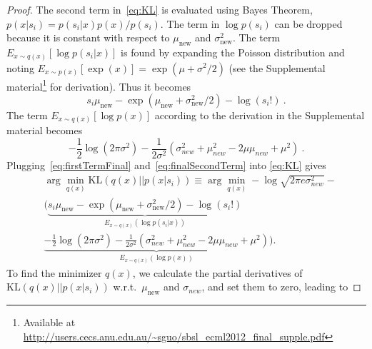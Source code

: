 \documentclass[runningheads,a4paper]{llncs}
\begin{document}
\begin{proof}
The second term in~\eqref{eq:KL} is evaluated using
Bayes Theorem,
$p(x|s_i)=p(s_i|x)p(x)/p(s_i)$.
The term in $\log p(s_i)$ can be dropped because it is constant
with respect to $\mu_{\text{new}}$ and $\sigma_{\text{new}}^2$.
The term $E_{x\sim q(x)} [\log p(s_i|x)]$ is found by expanding the
Poisson distribution and noting $E_{x\sim p(x)}[\exp(x)] = \exp(\mu+\sigma^2/2)$ (see the Supplemental material\footnote{Available at \url{http://users.cecs.anu.edu.au/~sguo/sbsl_ecml2012_final_supple.pdf}} for derivation).
Thus it becomes
{\small
\begin{equation}\label{eq:firstTermFinal}
  s_i \mu_{\text{new}} - \exp(\mu_{\text{new}} + \sigma_{\text{new}}^2/2) - \log(s_i!)~.
\end{equation}}
\noindent
The term $E_{x\sim q(x)}[\log p(x)]$
according to the derivation in the Supplemental material
becomes
{\small
\begin{equation}\label{eq:finalSecondTerm}
     -\frac{1}{2}\log(2\pi\sigma^2) -
         \frac{1}{2\sigma^2}\left(\sigma_{new}^2 + \mu_{new}^2-2\mu\mu_{new} + \mu^2 \right)~.
\end{equation}}
Plugging~\eqref{eq:firstTermFinal} and~\eqref{eq:finalSecondTerm} into
\eqref{eq:KL} gives
{\small
\begin{align*}
    &\arg\min_{q(x)}\text{KL}\left(q(x)|| p(x|s_i)\right) \equiv \arg\min_{q(x)}-\log\sqrt{2\pi e \sigma_{new}^2} - \nonumber \\
    &\bigg( \underbrace{s_i \mu_{\text{new}} - \exp(\mu_{\text{new}} + \sigma_{\text{new}}^2/2) - \log(s_i!)}_{E_{x\sim q(x)} (\log p(s_i|x))} \nonumber \\ 
    & \underbrace{-\frac{1}{2}\log(2\pi\sigma^2) - \frac{1}{2\sigma^2}\left(\sigma_{new}^2 + \mu_{new}^2-2\mu\mu_{new} + \mu^2 \right)}_{E_{x\sim q(x)}(\log p(x))} \bigg).
\end{align*}}
To find the minimizer $q(x)$, we calculate the partial derivatives of
$\text{KL}\left(q(x)|| p(x|s_i)\right)$ w.r.t.\
$\mu_{\text{new}}$ and $\sigma_{new}$, and set them to zero, leading to%

\end{proof}
\end{document}
